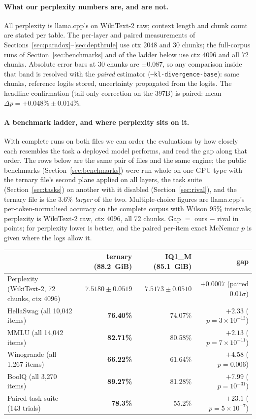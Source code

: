 \documentclass[10pt]{article} %
\begin{document}
\paragraph{What our perplexity numbers are, and are not.} All perplexity is
llama.cpp's on WikiText-2 raw; context length and chunk count are stated per
table. The per-layer and paired measurements of
Sections~\ref{sec:paradox}--\ref{sec:depthrule} use ctx 2048 and 30 chunks;
the full-corpus runs of Section~\ref{sec:benchmarks} and of the ladder below
use ctx 4096 and all 72 chunks. Absolute error bars at 30 chunks are
$\pm 0.087$, so any comparison inside that band is resolved with the
\emph{paired} estimator (\texttt{--kl-divergence-base}): same chunks,
reference logits stored, uncertainty propagated from the logits. The headline
confirmation (tail-only correction on the 397B) is paired: mean
$\Delta p = +0.048\% \pm 0.014\%$.

\paragraph{A benchmark ladder, and where perplexity sits on it.}
With complete runs on both files we can order the evaluations by how closely
each resembles the task a deployed model performs, and read the gap along that
order. The rows below are the same pair of files and the same engine; the
public benchmarks (Section~\ref{sec:benchmarks}) were run whole on one GPU
type with the ternary file's second plane applied on all layers, the task
suite (Section~\ref{sec:tasks}) on another with it disabled
(Section~\ref{sec:rival}), and the ternary
file is the 3.6\% \emph{larger} of the two. Multiple-choice figures are
llama.cpp's per-token-normalised accuracy on the complete corpus with Wilson
95\% intervals; perplexity is WikiText-2 raw, ctx 4096, all 72 chunks. Gap
$=$ ours $-$ rival in points; for perplexity lower is better, and the
paired per-item exact McNemar $p$ is given where the logs allow it.

\begin{center}
\small
\begin{tabular}{@{}lrrr@{}}
\toprule
 & ternary (88.2~GiB) & IQ1\_M (85.1~GiB) & gap \\
\midrule
Perplexity (WikiText-2, 72 chunks, ctx 4096) & $7.5180 \pm 0.0519$ & $7.5173 \pm 0.0510$ & $+0.0007$ (paired $0.01\sigma$) \\
HellaSwag (all 10,042 items)   & \textbf{76.40\%} & 74.07\% & $+2.33$ ($p = 3\times10^{-13}$) \\
MMLU (all 14,042 items)        & \textbf{82.71\%} & 80.58\% & $+2.13$ ($p = 7\times10^{-11}$) \\
Winogrande (all 1,267 items)   & \textbf{66.22\%} & 61.64\% & $+4.58$ ($p = 0.006$) \\
BoolQ (all 3,270 items)        & \textbf{89.27\%} & 81.28\% & $+7.99$ ($p = 10^{-31}$) \\
Paired task suite (143 trials) & \textbf{78.3\%}  & 55.2\%  & $+23.1$ ($p = 5\times10^{-7}$) \\
\bottomrule
\end{tabular}
\end{center}
\end{document}
